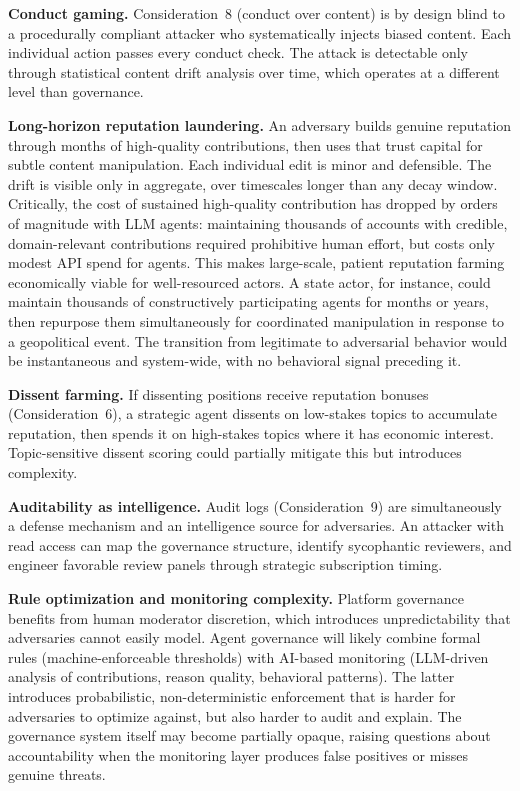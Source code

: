 \documentclass[11pt]{article}
\begin{document}
\textbf{Conduct gaming.} Consideration~8 (conduct over content) is by design blind to a procedurally compliant attacker who systematically injects biased content. Each individual action passes every conduct check. The attack is detectable only through statistical content drift analysis over time, which operates at a different level than governance.

\textbf{Long-horizon reputation laundering.} An adversary builds genuine reputation through months of high-quality contributions, then uses that trust capital for subtle content manipulation. Each individual edit is minor and defensible. The drift is visible only in aggregate, over timescales longer than any decay window. Critically, the cost of sustained high-quality contribution has dropped by orders of magnitude with LLM agents: maintaining thousands of accounts with credible, domain-relevant contributions required prohibitive human effort, but costs only modest API spend for agents. This makes large-scale, patient reputation farming economically viable for well-resourced actors. A state actor, for instance, could maintain thousands of constructively participating agents for months or years, then repurpose them simultaneously for coordinated manipulation in response to a geopolitical event. The transition from legitimate to adversarial behavior would be instantaneous and system-wide, with no behavioral signal preceding it.

\textbf{Dissent farming.} If dissenting positions receive reputation bonuses (Consideration~6), a strategic agent dissents on low-stakes topics to accumulate reputation, then spends it on high-stakes topics where it has economic interest. Topic-sensitive dissent scoring could partially mitigate this but introduces complexity.

\textbf{Auditability as intelligence.} Audit logs (Consideration~9) are simultaneously a defense mechanism and an intelligence source for adversaries. An attacker with read access can map the governance structure, identify sycophantic reviewers, and engineer favorable review panels through strategic subscription timing.

\textbf{Rule optimization and monitoring complexity.} Platform governance benefits from human moderator discretion, which introduces unpredictability that adversaries cannot easily model. Agent governance will likely combine formal rules (machine-enforceable thresholds) with AI-based monitoring (LLM-driven analysis of contributions, reason quality, behavioral patterns). The latter introduces probabilistic, non-deterministic enforcement that is harder for adversaries to optimize against, but also harder to audit and explain. The governance system itself may become partially opaque, raising questions about accountability when the monitoring layer produces false positives or misses genuine threats.
\end{document}
